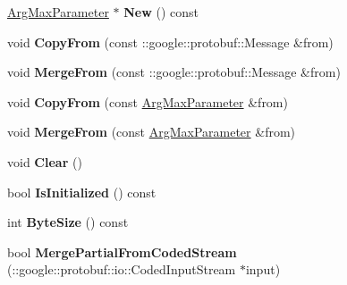 \begin{DoxyCompactItemize}
\mbox{\hyperlink{classcaffe_1_1_arg_max_parameter}{Arg\+Max\+Parameter}} $\ast$ {\bfseries New} () const
\item 
\mbox{\label{classcaffe_1_1_arg_max_parameter_a2f2f68bbf30d060da2aea09f2fc41545}} 
void {\bfseries Copy\+From} (const \+::google\+::protobuf\+::\+Message \&from)
\item 
\mbox{\label{classcaffe_1_1_arg_max_parameter_a5fc9078e77ee5ad381eaa925efe6371e}} 
void {\bfseries Merge\+From} (const \+::google\+::protobuf\+::\+Message \&from)
\item 
\mbox{\label{classcaffe_1_1_arg_max_parameter_a56ed9a318eeddcf5386abfdec9439544}} 
void {\bfseries Copy\+From} (const \mbox{\hyperlink{classcaffe_1_1_arg_max_parameter}{Arg\+Max\+Parameter}} \&from)
\item 
\mbox{\label{classcaffe_1_1_arg_max_parameter_a87101bad15e3d30d2a3f4bf088138f9d}} 
void {\bfseries Merge\+From} (const \mbox{\hyperlink{classcaffe_1_1_arg_max_parameter}{Arg\+Max\+Parameter}} \&from)
\item 
\mbox{\label{classcaffe_1_1_arg_max_parameter_ad0573348cf2f609ffb304905793e39c0}} 
void {\bfseries Clear} ()
\item 
\mbox{\label{classcaffe_1_1_arg_max_parameter_aa18d593f39d90bdf6890d0ef929998c4}} 
bool {\bfseries Is\+Initialized} () const
\item 
\mbox{\label{classcaffe_1_1_arg_max_parameter_aae2c222b3ee26d56e0896c87fc481633}} 
int {\bfseries Byte\+Size} () const
\item 
\mbox{\label{classcaffe_1_1_arg_max_parameter_a8c6e5d65aca437260295ff2d49d7e160}} 
bool {\bfseries Merge\+Partial\+From\+Coded\+Stream} (\+::google\+::protobuf\+::io\+::\+Coded\+Input\+Stream $\ast$input)
\item 
\mbox{\label{classcaffe_1_1_arg_max_parameter_a3bdc0ac5a1acabcb3a08b254ff810cdd}} 

\end{DoxyCompactItemize}
